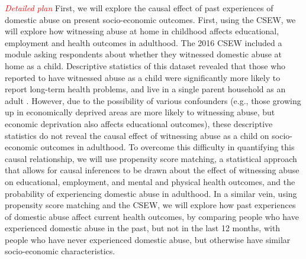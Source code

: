 \documentclass[11pt, a4paper]{article}
\begin{document}
%
%


\textcolor{red}{\textit{Detailed plan}} First, we will explore the causal effect of past experiences of domestic abuse on present socio-economic outcomes. First, using the CSEW, we will explore how witnessing abuse at home in childhood affects educational, employment and health outcomes in adulthood. The 2016 CSEW included a module asking respondents about whether they witnessed domestic abuse at home as a child. Descriptive statistics of this dataset revealed that those who reported to have witnessed abuse as a child were significantly more likely to report long-term health problems, and live in a single parent household as an adult \cite{ONSChildhood}. However, due to the possibility of various confounders (e.g., those growing up in economically deprived areas are more likely to witnessing abuse, but economic deprivation also affects educational outcomes), these descriptive statistics do not reveal the causal effect of witnessing abuse as a child on socio-economic outcomes in adulthood. To overcome this difficulty in quantifying this causal relationship, we will use propensity score matching, a statistical approach that allows for causal inferences to be drawn about the effect of witnessing abuse on educational, employment, and mental and physical health outcomes, and the probability of experiencing domestic abuse in adulthood. In a similar vein, using propensity score matching and the CSEW, we will explore how past experiences of domestic abuse affect current health outcomes, by comparing people who have experienced domestic abuse in the past, but not in the last 12 months, with people who have never experienced domestic abuse, but otherwise have similar socio-economic characteristics.
\end{document}
